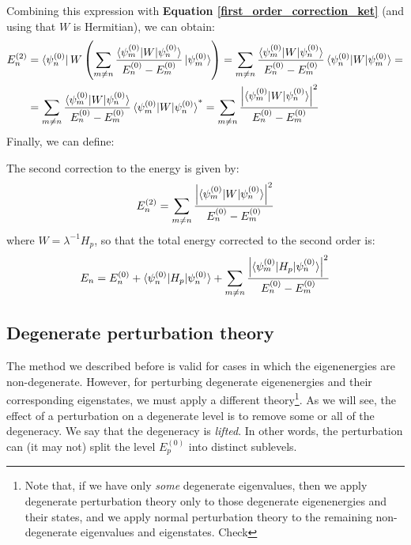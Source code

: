 Combining this expression with \textbf{Equation \ref{first_order_correction_ket}} (and using that $W$ is Hermitian), we can obtain:
\begin{equation}
    \begin{split}
        E_n^{(2)} &= \bra{\psi_n^{(0)}}W \left(\sum_{m\neq n} \frac{\braket{\psi_m^{(0)}|W|\psi_n^{(0)}}}{E_n^{(0)} - E_m^{(0)}}\ket{\psi_m^{(0)}}\right) = \sum_{m\neq n} \frac{\braket{\psi_m^{(0)}|W|\psi_n^{(0)}}}{E_n^{(0)} - E_m^{(0)}}\braket{\psi_n^{(0)}|W|\psi_m^{(0)}} = \\
        &= \sum_{m\neq n} \frac{\braket{\psi_m^{(0)}|W|\psi_n^{(0)}}}{E_n^{(0)} - E_m^{(0)}}\braket{\psi_m^{(0)}|W|\psi_n^{(0)}}^* = \sum_{m\neq n} \frac{\left|\braket{\psi_m^{(0)}|W|\psi_n^{(0)}}\right|^2}{E_n^{(0)} - E_m^{(0)}} \\
    \end{split}
\end{equation}
Finally, we can define:
\begin{definition}
    The second correction to the energy is given by:
    \begin{equation}
        E_n^{(2)} = \sum_{m\neq n} \frac{\left|\braket{\psi_m^{(0)}|W|\psi_n^{(0)}}\right|^2}{E_n^{(0)} - E_m^{(0)}}
    \end{equation}
    where $W = \lambda^{-1}H_p$, so that the total energy corrected to the second order is:
    \begin{equation}
        E_n = E_n^{(0)} + \braket{\psi_n^{(0)}|H_p|\psi_n^{(0)}} + \sum_{m\neq n} \frac{\left|\braket{\psi_m^{(0)}|H_p|\psi_n^{(0)}}\right|^2}{E_n^{(0)} - E_m^{(0)}}
    \end{equation}
\end{definition}

\subsection{Degenerate perturbation theory}

The method we described before is valid for cases in which the eigenenergies are non-degenerate. However, for perturbing degenerate eigenenergies and their corresponding eigenstates, we must apply a different theory\footnote{Note that, if we have only \textit{some} degenerate eigenvalues, then we apply degenerate perturbation theory only to those degenerate eigenenergies and their states, and we apply normal perturbation theory to the remaining non-degenerate eigenvalues and eigenstates.\color{red} Check}. As we will see, the effect of a perturbation on a degenerate level is to remove some or all of the degeneracy. We say that the degeneracy is \textit{lifted}. In other words, the perturbation can (it may not) split the level $E_p^{(0)}$ into distinct sublevels. 

